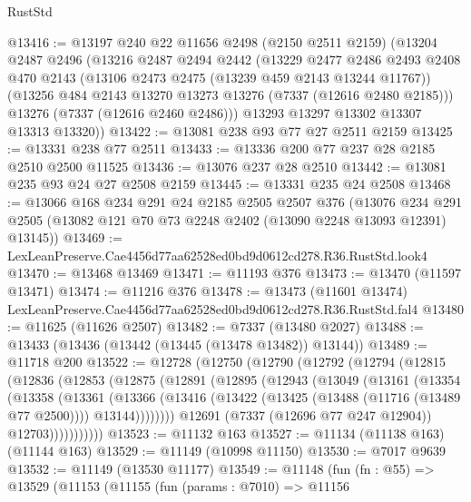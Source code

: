 \begin{lexlean}{RustStd}
\begin{coremodule}
@13416 := @13197
    @240
    @22
    @11656
    @2498
    (@2150 @2511 @2159)
    (@13204
      @2487
      @2496
      (@13216
        @2487
        @2494
        @2442
        (@13229
          @2477
          @2486
          @2493
          @2408
          @470
          @2143
          (@13106 @2473 @2475 (@13239 @459 @2143 @13244 @11767))
          (@13256 @484 @2143 @13270 @13273 @13276 (@7337 (@12616 @2480 @2185)))
          @13276
          (@7337 (@12616 @2460 @2486)))
        @13293
        @13297
        @13302
        @13307
        @13313
        @13320))
@13422 := @13081 @238 @93 @77 @27 @2511 @2159
@13425 := @13331 @238 @77 @2511
@13433 := @13336 @200 @77 @237 @28 @2185 @2510 @2500 @11525
@13436 := @13076 @237 @28 @2510
@13442 := @13081 @235 @93 @24 @27 @2508 @2159
@13445 := @13331 @235 @24 @2508
@13468 := @13066
    @168
    @234
    @291
    @24
    @2185
    @2505
    @2507
    @376
    (@13076 @234 @291 @2505 (@13082 @121 @70 @73 @2248 @2402 (@13090 @2248 @13093 @12391) @13145))
@13469 := LexLeanPreserve.Cae4456d77aa62528ed0bd9d0612cd278.R36.RustStd.look4
@13470 := @13468 @13469
@13471 := @11193 @376
@13473 := @13470 (@11597 @13471)
@13474 := @11216 @376
@13478 := @13473 (@11601 @13474) LexLeanPreserve.Cae4456d77aa62528ed0bd9d0612cd278.R36.RustStd.fal4
@13480 := @11625 (@11626 @2507)
@13482 := @7337 (@13480 @2027)
@13488 := @13433 (@13436 (@13442 (@13445 (@13478 @13482)) @13144))
@13489 := @11718 @200
@13522 := @12728
    (@12750
      (@12790
        (@12792
          (@12794
            (@12815
              (@12836
                (@12853
                  (@12875
                    (@12891
                      (@12895
                        (@12943
                          (@13049
                            (@13161
                              (@13354
                                (@13358
                                  (@13361
                                    (@13366
                                      (@13416
                                        (@13422
                                          (@13425 (@13488 (@11716 (@13489 @77 @2500))))
                                          @13144))))))))
                          @12691
                          (@7337 (@12696 @77 @247 @12904))
                          @12703)))))))))))
@13523 := @11132 @163
@13527 := @11134 (@11138 @163) (@11144 @163)
@13529 := @11149 (@10998 @11150)
@13530 := @7017 @9639
@13532 := @11149 (@13530 @11177)
@13549 := @11148
    (fun (fn : @55) =>
    @13529
      (@11153
        (@11155
          (fun (params : @7010) =>
          @11156

\end{coremodule}
\end{lexlean}
